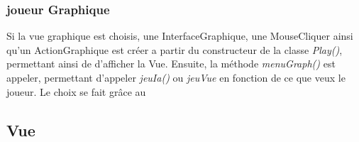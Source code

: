         \subsubsection{joueur Graphique}
        Si la vue graphique est choisis, une InterfaceGraphique, une MouseCliquer ainsi qu'un ActionGraphique est créer a partir du constructeur de la classe \textit{Play()}, permettant ainsi de d'afficher la Vue. Ensuite, la méthode \textit{menuGraph()} est appeler, permettant d'appeler \textit{jeuIa()} ou \textit{jeuVue} en fonction de ce que veux le joueur. Le choix se fait grâce au



    \subsection{Vue}


